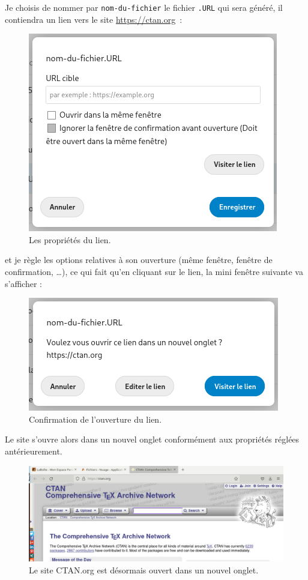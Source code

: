 Je choisis de nommer par \texttt{nom-du-fichier} le fichier \texttt{.URL} qui sera généré, il contiendra un lien vers le site \url{https://ctan.org}~:
\begin{figure}
	\centering
	\includegraphics[width=0.333\linewidth]{./Captures/nuage.url.proprietes.png}
	\caption{Les propriétés du lien.}
\end{figure}

et je règle les options relatives à son ouverture (même fenêtre, fenêtre de confirmation, \ldots), ce qui fait qu'en cliquant sur le lien, la mini fenêtre suivante va s'afficher :
\begin{figure}
	\centering
	\includegraphics[width=0.333\linewidth]{./Captures/nuage.url.fenetre.confirmation.png}
	\caption{Confirmation de l'ouverture du lien.}
\end{figure}

Le site s'ouvre alors dans un nouvel onglet conformément aux propriétés réglées antérieurement.
\begin{figure}
	\centering
	\includegraphics{./Captures/nuage.url.ouverture.nouvel.onglet.png}
	\caption{Le site CTAN.org est désormais ouvert dans un nouvel onglet.}
\end{figure}